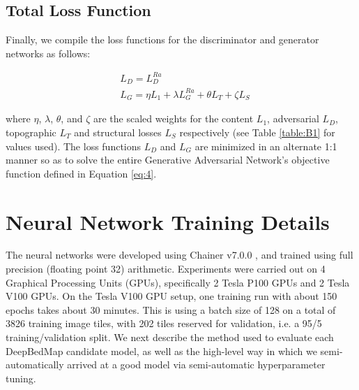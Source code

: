 \documentclass[tc, manuscript]{copernicus}
\begin{document}
\subsection{Total Loss Function}

Finally, we compile the loss functions for the discriminator and generator networks as follows:

\begin{align}
  & L_D = L_D^{Ra} \label{eq:A8}\\
  & L_G = \eta L_1 + \lambda L_G^{Ra} + \theta L_T + \zeta L_S \label{eq:A9}
\end{align}

where $\eta$, $\lambda$, $\theta$, and $\zeta$ are the scaled weights for the content $L_1$, adversarial $L_D$, topographic $L_T$ and structural losses $L_S$ respectively (see Table \ref{table:B1} for values used).
The loss functions $L_D$ and $L_G$ are minimized in an alternate 1:1 manner so as to solve the entire Generative Adversarial Network's objective function defined in Equation \eqref{eq:4}.


\section{Neural Network Training Details} \label{appendix:B}

The neural networks were developed using Chainer v7.0.0 \citep{TokuiChainerDeepLearning2019}, and trained using full precision (floating point 32) arithmetic.
Experiments were carried out on 4 Graphical Processing Units (GPUs), specifically 2 Tesla P100 GPUs and 2 Tesla V100 GPUs.
On the Tesla V100 GPU setup, one training run with about 150 epochs takes about 30 minutes.
This is using a batch size of 128 on a total of 3826 training image tiles, with 202 tiles reserved for validation, i.e. a 95/5 training/validation split.
We next describe the method used to evaluate each DeepBedMap candidate model, as well as the high-level way in which we semi-automatically arrived at a good model via semi-automatic hyperparameter tuning.
\end{document}
